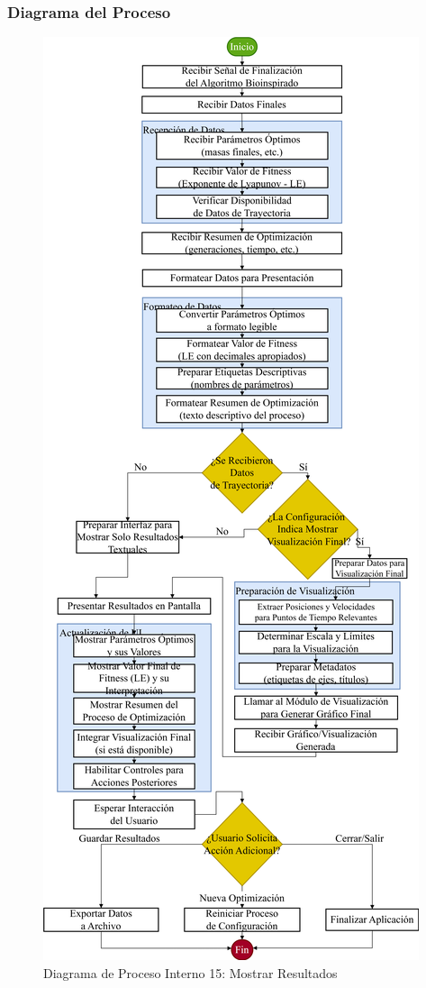 \subsubsection{Diagrama del Proceso}
\begin{figure}[H]
    \centering
    \includegraphics[width=\textwidth]{img/Analisis/DiagramaProcesos/DiagramaProceso15_Proceso Interno_Mostrar Resultados.png}
    \caption{Diagrama de Proceso Interno 15: Mostrar Resultados}%
    \label{fig:process_diagram15}
\end{figure}